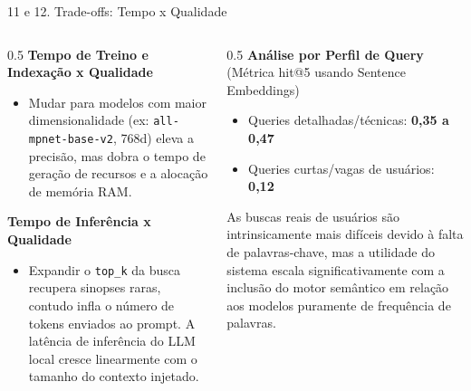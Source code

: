 \documentclass[10pt, aspectratio=169]{beamer}
\begin{document}
\begin{frame}{11 e 12. Trade-offs: Tempo x Qualidade}
    \begin{columns}[T]
        \begin{column}{0.5\textwidth}
            \textbf{Tempo de Treino e Indexação x Qualidade}
            \begin{itemize}
                \item Mudar para modelos com maior dimensionalidade (ex: \texttt{all-mpnet-base-v2}, 768d) eleva a precisão, mas dobra o tempo de geração de recursos e a alocação de memória RAM.
            \end{itemize}
            \vspace{0.3cm}
            \textbf{Tempo de Inferência x Qualidade}
            \begin{itemize}
                \item Expandir o \texttt{top\_k} da busca recupera sinopses raras, contudo infla o número de tokens enviados ao prompt. A latência de inferência do LLM local cresce linearmente com o tamanho do contexto injetado.
            \end{itemize}
        \end{column}
        \begin{column}{0.5\textwidth}
            \textbf{Análise por Perfil de Query} \\
            \footnotesize (Métrica hit@5 usando Sentence Embeddings) \normalsize
            \begin{itemize}
                \item Queries detalhadas/técnicas: \textbf{0,35 a 0,47}
                \item Queries curtas/vagas de usuários: \textbf{0,12}
            \end{itemize}
            \vspace{0.2cm}
            \small
            As buscas reais de usuários são intrinsicamente mais difíceis devido à falta de palavras-chave, mas a utilidade do sistema escala significativamente com a inclusão do motor semântico em relação aos modelos puramente de frequência de palavras.
        \end{column}
    \end{columns}
\end{frame}
\end{document}
